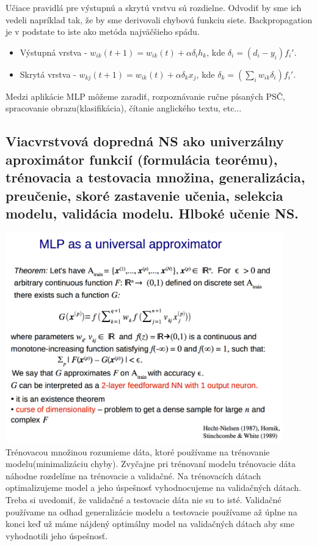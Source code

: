 \documentclass{article}
\numberwithin{equation}{section} %
\begin{document}
Učiace pravidlá pre výstupnú a skrytú vrstvu sú rozdielne. Odvodiť by sme ich vedeli napríklad tak, že by sme derivovali chybovú funkciu siete. Backpropagation je v podstate to iste ako metóda najväčšieho spádu.
\begin{itemize}
\item Výstupná vrstva - $ w_{ik}(t+1) = w_{ik}(t) + \alpha\delta_ih_k $, kde $\delta_i = (d_i - y_i)f_i'$.
\item Skrytá vrstva - $ w_{kj}(t+1) = w_{ik}(t) + \alpha\delta_kx_j $, kde $\delta_k = (\sum_iw_{ik}\delta_i)f_i'$.
\end{itemize}
Medzi aplikácie MLP môžeme zaradiť, rozpoznávanie ručne písaných PSČ, spracovanie obrazu(klasifikácia), čítanie anglického textu, etc...

\subsection{Viacvrstvová dopredná NS ako univerzálny aproximátor funkcií (formulácia teorému), trénovacia a testovacia množina, generalizácia, preučenie, skoré zastavenie učenia, selekcia modelu, validácia modelu. Hlboké učenie NS.}
\includegraphics[width=12cm]{imgs/uni_aprox}\\
Trénovacou množinou rozumieme dáta, ktoré používame na trénovanie modelu(minimalizáciu chyby). Zvyčajne pri trénovaní modelu trénovacie dáta náhodne rozdelíme na trénovacie a validačné. Na trénovacích dátach optimalizujeme model a jeho úspešnosť vyhodnocujeme na validačných dátach. Treba si uvedomiť, že validačné a testovacie dáta nie su to isté. Validačné používame na odhad generalizácie modelu a testovacie používame až úplne na konci keď už máme nájdený optimálny model na validačných dátach aby sme vyhodnotili jeho úspešnosť.
\end{document}
